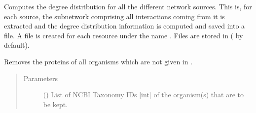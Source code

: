 \documentclass[letterpaper,10pt,english]{sphinxmanual}
\begin{document}
\begin{fulllineitems}
\begin{fulllineitems}
\end{fulllineitems}


\begin{fulllineitems}
\label{\detokenize{reference:pypath.main.PyPath.degree_dists}}
Computes the degree distribution for all the different network
sources. This is, for each source, the subnetwork comprising all
interactions coming from it is extracted and the degree
distribution information is computed and saved into a file.
A file is created for each resource under the name
. Files are stored
in  ( by
default).

\end{fulllineitems}


\begin{fulllineitems}
\label{\detokenize{reference:pypath.main.PyPath.delete_by_organism}}
Removes the proteins of all organisms which are not given in
.
\begin{quote}\begin{description}
\item[{Parameters}] \leavevmode
{} (\sphinxstyleliteralemphasis{\sphinxupquote{,}}) \textendash{} List of NCBI Taxonomy IDs {[}int{]} of the organism(s) that are
to be kept.

\end{description}\end{quote}

\end{fulllineitems}



\end{fulllineitems}
\end{document}
